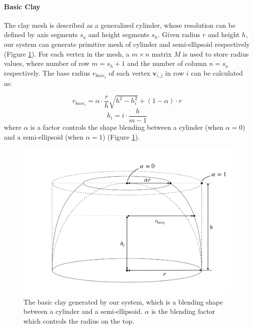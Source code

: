 \documentclass{svjour3}                     %
\begin{document}
\paragraph{Basic Clay} The clay mesh is described as a generalized cylinder, whose resolution can be defined by axis segments $s_{a}$ and height segments $s_{h}$. Given radius $r$ and height $h$, our system can generate primitive mesh of cylinder and semi-ellipsoid respectively (Figure \ref{fig:base}).
For each vertex in the mesh, a $m \times n$ matrix $M$ is used to store radius values, where number of row $m = s_{h} + 1$ and the number of column $n = s_{a}$ respectively. The base radius $r_{base_{i}}$ of each vertex $\mathbf{v}_{i,j}$ in row $i$ can be calculated as: 

\begin{equation}
r_{base_{i}} = \alpha \cdot \frac{r}{h} \sqrt{h^2 -  h_{i}^2} + (1 - \alpha) \cdot r
\end{equation}
\begin{equation}
h_{i} = i \cdot \frac{h}{m-1}
\end{equation}
where $\alpha$ is a factor controls the shape blending between a  cylinder (when $\alpha=0$) and a semi-ellipsoid (when $\alpha=1$) (Figure \ref{fig:base}).

\begin{figure}
\includegraphics[width=\textwidth]{fig3.pdf}
\caption{The basic clay generated by our system, which is a blending shape between a cylinder and a semi-ellipsoid. $\alpha$ is the blending factor which controls the radius on the top.}
\label{fig:base}
\end{figure}
\end{document}
